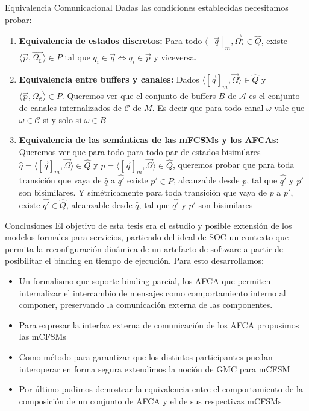 \documentclass[10pt,xcolor={table,dvipsnames},t]{beamer}
\begin{document}
\begin{frame}{Equivalencia Comunicacional}
Dadas las condiciones establecidas necesitamos probar:
\begin{enumerate}
    \item \textbf{Equivalencia de estados discretos:} Para todo $\langle [\overrightarrow{q}]_m, \overrightarrow{\Omega} \rangle \in \widehat{Q}$, existe $\langle \overrightarrow{p}, \overrightarrow{\Omega_{\mathcal{C}}} \rangle \in P$ tal que $q_i \in \overrightarrow{q} \iff q_i \in \overrightarrow{p}$ y viceversa.
    \item \textbf{Equivalencia entre buffers y canales:} Dados $\langle [\overrightarrow{q}]_m, \overrightarrow{\Omega} \rangle \in \widehat{Q}$ y $\langle \overrightarrow{p}, \overrightarrow{\Omega_{\mathcal{C}}} \rangle \in P$. Queremos ver que el conjunto de buffers $B$ de $\mathcal{A}$ es el conjunto de canales internalizados de $\mathcal{C}$ de $M$. Es decir que para todo canal $\omega$ vale que $\omega \in \mathcal{C}$ si y solo si $\omega \in B$
    \item \textbf{Equivalencia de las semánticas de las mFCSMs y los AFCAs:} Queremos ver que para todo para todo par de estados bisimilares $\widehat{q}=\langle [\overrightarrow{q}]_m, \overrightarrow{\Omega} \rangle \in \widehat{Q}$ y $p=\langle [\overrightarrow{q}]_m, \overrightarrow{\Omega} \rangle \in \widehat{Q}$, queremos probar que para toda transición que vaya de $\widehat{q}$ a $\widehat{q'}$ existe $p' \in P$, alcanzable desde $p$, tal que $\widehat{q'}$ y $p'$ son bisimilares. Y simétricamente para toda transición que vaya de $p$ a $p'$, existe $\widehat{q'} \in \widehat{Q}$, alcanzable desde $\widehat{q}$, tal que $\widehat{q'}$ y $p'$ son bisimilares
\end{enumerate}
    
\end{frame}

\begin{frame}{Conclusiones}
El objetivo de esta tesis era el estudio y posible extensión de los modelos formales para servicios, partiendo del ideal de SOC un contexto que permita la reconfiguración dinámica de un artefacto de software a partir de posibilitar el binding en tiempo de ejecución. Para esto desarrollamos:
\begin{itemize}
    \item Un formalismo que soporte binding parcial, los AFCA que permiten internalizar el intercambio de mensajes como comportamiento interno al componer, preservando la comunicación externa de las componentes.
    \item Para expresar la interfaz externa de comunicación de los AFCA propusimos las mCFSMs
    \item Como método para garantizar que los distintos participantes puedan interoperar en forma segura extendimos la noción de GMC para mCFSM
    \item Por último pudimos demostrar la equivalencia entre el comportamiento de la composición de un conjunto de AFCA y el de sus respectivas mCFSMs
\end{itemize}
\end{frame}
\end{document}
